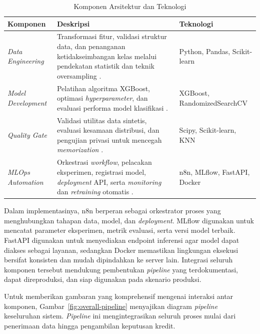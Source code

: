 \begin{table}[H]
\centering
\caption{Komponen Arsitektur dan Teknologi}
\label{tab:arsitektur}
\begin{tabularx}{\textwidth}{|p{3.2cm}|X|p{4cm}|}
\hline
\textbf{Komponen} & \textbf{Deskripsi} & \textbf{Teknologi} \\ \hline
\textit{Data Engineering} & Transformasi fitur, validasi struktur data, dan penanganan ketidakseimbangan kelas melalui pendekatan statistik dan teknik oversampling \cite{maurino2025data}. & Python, Pandas, Scikit-learn \\ \hline
\textit{Model Development} & Pelatihan algoritma XGBoost, optimasi \textit{hyperparameter}, dan evaluasi performa model klasifikasi \cite{yotsawat2021improved, idhom2025evaluation}. & XGBoost, RandomizedSearchCV \\ \hline
\textit{Quality Gate} & Validasi utilitas data sintetis, evaluasi kesamaan distribusi, dan pengujian privasi untuk mencegah \textit{memorization} \cite{fca2024synthetic}. & Scipy, Scikit-learn, KNN \\ \hline
\textit{MLOps Automation} & Orkestrasi \textit{workflow}, pelacakan eksperimen, registrasi model, \textit{deployment} API, serta \textit{monitoring} dan \textit{retraining} otomatis \cite{n8n2025docs, Kreuzberger2023}. & n8n, MLflow, FastAPI, Docker \\ \hline
\end{tabularx}
\end{table}

Dalam implementasinya, n8n berperan sebagai orkestrator proses yang menghubungkan tahapan data, model, dan \textit{deployment}. MLflow digunakan untuk mencatat parameter eksperimen, metrik evaluasi, serta versi model terbaik. FastAPI digunakan untuk menyediakan endpoint inferensi agar model dapat diakses sebagai layanan, sedangkan Docker memastikan lingkungan eksekusi bersifat konsisten dan mudah dipindahkan ke server lain. Integrasi seluruh komponen tersebut mendukung pembentukan \textit{pipeline} yang terdokumentasi, dapat direproduksi, dan siap digunakan pada skenario produksi.

Untuk memberikan gambaran yang komprehensif mengenai interaksi antar komponen, Gambar~\ref{fig:overall-pipeline} menyajikan diagram \textit{pipeline} keseluruhan sistem. \textit{Pipeline} ini mengintegrasikan seluruh proses mulai dari penerimaan data hingga pengambilan keputusan kredit.

